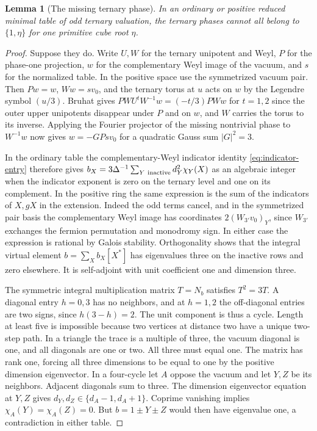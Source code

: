 \documentclass[11pt,a4paper]{article}
\numberwithin{equation}{section}
\newtheorem{lemma}[theorem]{Lemma}
\theoremstyle{remark}
\begin{document}
\begin{lemma}[The missing ternary phase]\label{short:ternary-phase}
In an ordinary or positive reduced minimal table of odd ternary
valuation, the ternary phases cannot all belong to
$\{1,\eta\}$ for one primitive cube root $\eta$.
\end{lemma}
\begin{proof}
Suppose they do. Write $U,W$ for the ternary unipotent and Weyl,
$P$ for the phase-one projection, $w$ for the complementary Weyl
image of the vacuum, and $s$ for the normalized table. In the
positive space use the symmetrized vacuum pair. Then $Pw=w$,
$Ww=sv_0$, and the ternary torus at $u$ acts on $w$ by the
Legendre symbol $(u/3)$. Bruhat gives
$PWU^tW^{-1}w=(-t/3)PWw$ for $t=1,2$ since
the outer upper unipotents disappear under $P$ and on $w$, and
$W$ carries the torus to its inverse. Applying the Fourier projector
of the missing nontrivial phase to $W^{-1}w$ now gives
$w=-G Psv_0$ for a quadratic Gauss sum $|G|^2=3$.

In the ordinary table the complementary-Weyl indicator
identity \eqref{eq:indicator-entry} therefore gives
$b_X=3\Delta^{-1}\sum_{Y\ {\rm inactive}}d_Y^2\chi_Y(X)$
as an algebraic integer when the indicator exponent is zero on the
ternary level and one on its complement. In the positive ring the
same expression is the sum of the indicators of $X,gX$ in the
extension. Indeed the odd terms cancel, and in the symmetrized
pair basis the complementary Weyl image has coordinates
$2(W_{3'}v_0)_Y$, since $W_{3'}$ exchanges the fermion permutation
and monodromy sign. In either case the expression is rational by
Galois stability. Orthogonality shows that the integral virtual
element $b=\sum_X b_X[X^*]$ has eigenvalues three on the inactive
rows and zero elsewhere. It is self-adjoint with unit coefficient one
and dimension three.

The symmetric integral multiplication matrix $T=N_b$ satisfies
$T^2=3T$. A diagonal entry $h=0,3$ has no neighbors, and at $h=1,2$
the off-diagonal entries are two signs, since $h(3-h)=2$. The unit
component is thus a cycle. Length at least five is impossible because
two vertices at distance two have a unique two-step path. In a
triangle the trace is a multiple of three, the vacuum diagonal is
one, and all diagonals are one or two. All three must equal one. The
matrix has rank one, forcing all three dimensions to be equal to
one by the positive dimension eigenvector. In a four-cycle let $A$
oppose the vacuum and let $Y,Z$ be its neighbors. Adjacent
diagonals sum to three. The dimension eigenvector equation at
$Y,Z$ gives $d_Y,d_Z\in\{d_A-1,d_A+1\}$. Coprime vanishing implies
$\chi_A(Y)=\chi_A(Z)=0$. But $b=1\pm Y\pm Z$ would then have
eigenvalue one, a contradiction in either table.
\end{proof}
\end{document}
